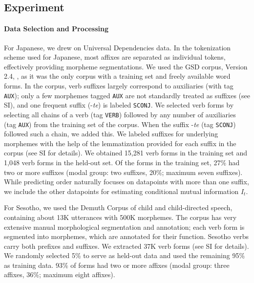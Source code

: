 

\subsection{Experiment}
\paragraph{Data Selection and Processing}
For Japanese, we drew on Universal Dependencies data.
In the tokenization scheme used for Japanese, most affixes are separated as individual tokens, effectively providing morpheme segmentations.
We used the GSD corpus, Version 2.4, \citep{tanaka2016universal, asahara2018universal}, as it was the only corpus with a training set and freely available word forms.
In the corpus, verb suffixes largely correspond to auxiliaries (with tag \texttt{AUX}); only a few morphemes tagged \texttt{AUX} are not standardly treated as suffixes (see SI), and one frequent suffix (-\textit{te}) is labeled \texttt{SCONJ}.
We selected verb forms by selecting all chains of a verb (tag \texttt{VERB}) followed by any number of auxiliaries (tag \texttt{AUX}) from the training set of the corpus. When the suffix -\textit{te} (tag \texttt{SCONJ}) followed such a chain, we added this.
We labeled suffixes for underlying morphemes with the help of the lemmatization provided for each suffix in the corpus (see SI for details).
We obtained 15,281 verb forms in the training set and 1,048 verb forms in the held-out set.
Of the forms in the training set, 27\% had two or more suffixes (modal group: two suffixes, 20\%; maximum seven suffixes).
While predicting order naturally focuses on datapoints with more than one suffix, we include the other datapoints for estimating conditional mutual information $I_t$.


For Sesotho, we used the Demuth Corpus \citep{demuth1992acquisition} of child and child-directed speech, containing about 13K utterances with 500K morphemes.
The corpus has very extensive manual morphological segmentation and annotation; each verb form is segmented into morphemes, which are annotated for their function.
Sesotho verbs carry both prefixes and suffixes.
We extracted 37K verb forms (see SI for details).
We randomly selected 5\% to serve as held-out data and used the remaining 95\% as training data.
93\% of forms had two or more affixes (modal group: three affixes, 36\%; maximum eight affixes).

